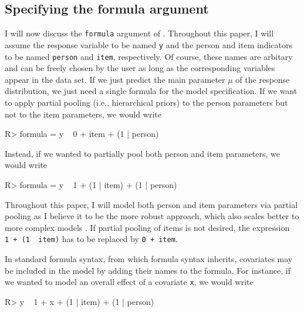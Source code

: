 \documentclass[
]{jss}
\begin{document}
\hypertarget{formula-prior}{%
\subsection{Specifying the formula argument}\label{formula-prior}}

I will now discuss the \texttt{formula} argument of .
Throughout this paper, I will assume the response variable to be named
\texttt{y} and the person and item indicators to be named
\texttt{person} and \texttt{item}, respectively. Of course, these names
are arbitary and can be freely chosen by the user as long as the
corresponding variables appear in the data set. If we just predict the
main parameter \(\mu\) of the response distribution, we just need a
single  formula for the model specification. If we want to
apply partial pooling (i.e., hierarchical priors) to the person
parameters but not to the item parameters, we would write

\begin{CodeChunk}

\begin{CodeInput}
R> formula = y ~ 0 + item + (1 | person)
\end{CodeInput}
\end{CodeChunk}

Instead, if we wanted to partially pool both person and item parameters,
we would write

\begin{CodeChunk}

\begin{CodeInput}
R> formula = y ~ 1 + (1 | item) + (1 | person)
\end{CodeInput}
\end{CodeChunk}

Throughout this paper, I will model both person and item parameters via
partial pooling as I believe it to be the more robust approach, which
also scales better to more complex models \citep{gelmanMLM2006}. If
partial pooling of items is not desired, the expression
\texttt{1\ +\ (1\ \textbar{}\ item)} has to be replaced by
\texttt{0\ +\ item}.

In standard  formula syntax, from which  formula
syntax inherits, covariates may be included in the model by adding their
names to the formula. For instance, if we wanted to model an overall
effect of a covariate \texttt{x}, we would write

\begin{CodeChunk}

\begin{CodeInput}
R> y ~ 1 + x + (1 | item) + (1 | person)
\end{CodeInput}
\end{CodeChunk}
\end{document}
